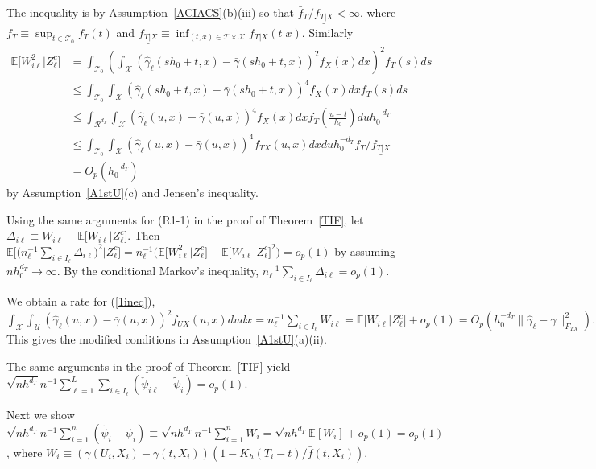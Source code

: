 \documentclass[lettersize, 12pt]{article}
\begin{document}
{The inequality is by Assumption~\ref{ACIACS}(b)(iii) so that $\bar f_T/\underline{f_{T|X}} < \infty$, 
where $\bar f_T \equiv \sup_{t\in\mathcal{T}_0} f_T(t)$ and $\underline{f_{T|X}} \equiv \inf_{(t,x)\in\mathcal{T}\times\mathcal{X}}f_{T|X}(t|x)$.
Similarly
\begin{align*}
\mathbb{E}\big[ W_{i\ell}^2 \big| Z_\ell^c\big] 
&= \int_{\mathcal{T}_0} \left(  \int_\mathcal{X} \left(\hat\gamma_\ell(sh_0+t, x) - \bar \gamma(sh_0+t, x)\right)^2 f_X(x) dx\right)^2 f_T(s) ds
\\
&\leq 
\int_{\mathcal{T}_0} \int_\mathcal{X} \left(\hat\gamma_\ell(sh_0+t, x) - \bar \gamma(sh_0+t, x)\right)^4 f_X(x) dx f_T(s) ds
\\
&\leq \int_{\mathcal{R}^{d_T}} \int_\mathcal{X} \left(\hat\gamma_\ell(u, x) - \bar \gamma(u, x)\right)^4 f_X(x) dx f_T\left(\frac{u-t}{h_0}\right) du h_0^{-d_T}
\\
&\leq  \int_{\mathcal{T}_0} \int_\mathcal{X} \left(\hat\gamma_\ell(u, x) - \bar \gamma(u, x)\right)^4 f_{TX}(u, x) dx  du h_0^{-d_T}\bar f_T/\underline{f_{T|X}} 
\\
&= O_p(h_0^{-d_T})
\end{align*}
by Assumption~\ref{A1stU}(c) and Jensen's inequality.  

Using the same arguments for (R1-1) in the proof of Theorem~\ref{TIF}, let $\Delta_{i\ell} \equiv W_{i\ell} - \mathbb{E}\big[W_{i\ell}\big|Z_\ell^c\big]$.
Then $\mathbb{E}\big[\big( n_\ell^{-1}\sum_{i\in I_\ell}\Delta_{i\ell}\big)^2\big|Z_\ell^c\big] =
n_\ell^{-1}\big(
\mathbb{E}\big[ W_{i\ell}^2 \big| Z_\ell^c\big] - \mathbb{E}\big[W_{i\ell}\big|Z_\ell^c\big]^2
\big) = o_p(1)$ by assuming $nh_0^{d_T}\rightarrow\infty$.
By the conditional Markov's inequality, $n_\ell^{-1}\sum_{i\in I_\ell}\Delta_{i\ell} = o_p(1)$.

We obtain a rate for (\ref{1ineq}),  
$\int_\mathcal{X}\int_{\mathcal{U}} \left( \hat\gamma_\ell(u,x)-\bar \gamma(u,x)\right)^2 f_{UX}(u,x) dudx
= n_{\ell}^{-1}\sum_{i\in I_\ell} W_{i\ell} = \mathbb{E}\big[W_{i\ell}\big|Z_\ell^c\big]  + o_p(1)
= O_p\left(h_0^{-d_T}\|\hat\gamma_\ell-\gamma\|_{F_{TX}}^2 \right).$
This gives the modified conditions in Assumption~\ref{A1stU}(a)(ii).


The same arguments in the proof of Theorem~\ref{TIF} yield $\sqrt{nh^{d_T}} n^{-1}\sum_{\ell=1}^L\sum_{i\in I_\ell} (\check \psi_{i\ell} - \tilde\psi_i) = o_p(1)$. 


Next we show
$\sqrt{nh^{d_T}} n^{-1}\sum_{i=1}^n ( \tilde\psi_i - \psi_i)
\equiv \sqrt{nh^{d_T}} n^{-1}\sum_{i=1}^n W_i = \sqrt{nh^{d_T}} \mathbb{E}[W_i] + o_p(1) = o_p(1)$, where
$W_i \equiv (\bar \gamma(U_i, X_i) - \bar \gamma(t, X_i))(1-K_h(T_i -t)/\bar f(t,X_i))$.

}
\end{document}
